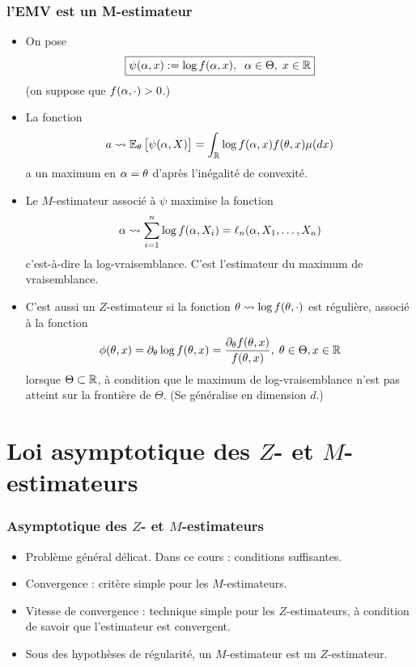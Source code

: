 \begin{frame}
\frametitle{l'EMV est  un M-estimateur}
\begin{itemize}
\item On pose
$$\boxed{\psi(\alpha,x):=\log f(\alpha,x),\;\;\alpha \in \Theta,\;x\in\operatorname{{\mathbb R}}}$$
(on suppose que $f(\alpha,\cdot) >0$.)
\item La fonction
$$a \leadsto \operatorname{{\mathbb E}}_\theta \big[\psi(\alpha,X)\big]=\int_{\operatorname{{\mathbb R}}}\log f(\alpha,x) f(\theta,x) \mu(dx)$$
a un maximum en $\alpha=\theta$ d'après \alert{l'inégalité de convexité}.
\end{itemize}
\end{frame}

\begin{frame}
\begin{itemize}
\item Le $M$-estimateur associé à $\psi$ maximise la fonction
$$\alpha \leadsto \sum_{i = 1}^n \log f(\alpha, X_i) = \ell_n(\alpha, X_1,\ldots, X_n)$$
c'est-à-dire la \alert{ log-vraisemblance}. C'est \alert{l'estimateur du maximum de vraisemblance}.

\item C'est aussi un $Z$-estimateur si la fonction $\theta \leadsto \log f(\theta, \cdot)$ est régulière, associé à la fonction
$$\phi(\theta, x) = \partial_\theta \log f(\theta, x) = \frac{\partial_\theta f(\theta, x)}{f(\theta, x)},\;\theta \in \Theta, x\in \operatorname{{\mathbb R}}$$
lorsque $\Theta \subset \operatorname{{\mathbb R}}$, \`a condition que le maximum de
log-vraisemblance n'est pas atteint sur la frontière de $\Theta$.
(Se généralise en dimension $d$.)
\end{itemize}
\end{frame}


\section{Loi asymptotique des $Z$- et $M$- estimateurs}

\begin{frame}
\frametitle{Asymptotique des $Z$- et $M$-estimateurs}
\begin{itemize}
\item Problème général \alert{délicat}. Dans ce cours : conditions suffisantes.
\item \alert{Convergence} : critère simple pour les $M$-estimateurs.
\item \alert{Vitesse de convergence} : technique simple pour les $Z$-estimateurs, à condition de savoir que l'estimateur est convergent.
\item Sous des hypothèses de régularité, un $M$-estimateur est un $Z$-estimateur.
\end{itemize}
\end{frame}

